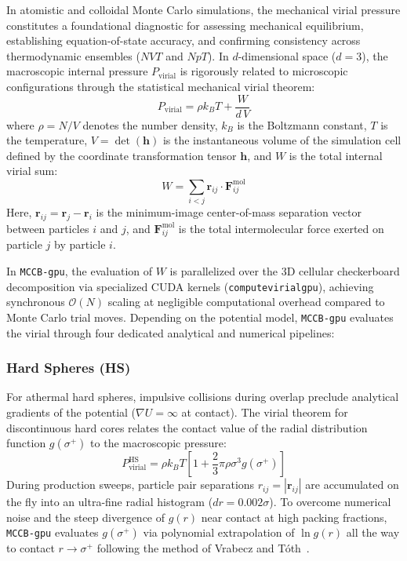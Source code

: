 \documentclass[final,5p,times,twocolumn]{elsarticle}
\begin{document}
In atomistic and colloidal Monte Carlo simulations, the mechanical virial pressure constitutes a foundational diagnostic for assessing mechanical equilibrium, establishing equation-of-state accuracy, and confirming consistency across thermodynamic ensembles ($NVT$ and $NpT$). In $d$-dimensional space ($d=3$), the macroscopic internal pressure $P_{\text{virial}}$ is rigorously related to microscopic configurations through the statistical mechanical virial theorem:
\begin{equation}
    P_{\text{virial}} = \rho k_B T + \frac{W}{d\,V}
    \label{eq:virial_general}
\end{equation}
where $\rho = N/V$ denotes the number density, $k_B$ is the Boltzmann constant, $T$ is the temperature, $V = \det(\mathbf{h})$ is the instantaneous volume of the simulation cell defined by the coordinate transformation tensor $\mathbf{h}$, and $W$ is the total internal virial sum:
\begin{equation}
    W = \sum_{i < j} \mathbf{r}_{ij} \cdot \mathbf{F}_{ij}^{\text{mol}}
    \label{eq:virial_w_general}
\end{equation}
Here, $\mathbf{r}_{ij} = \mathbf{r}_j - \mathbf{r}_i$ is the minimum-image center-of-mass separation vector between particles $i$ and $j$, and $\mathbf{F}_{ij}^{\text{mol}}$ is the total intermolecular force exerted on particle $j$ by particle $i$. 

In \texttt{MCCB-gpu}, the evaluation of $W$ is parallelized over the 3D cellular checkerboard decomposition via specialized CUDA kernels (\texttt{computevirialgpu}), achieving synchronous $\mathcal{O}(N)$ scaling at negligible computational overhead compared to Monte Carlo trial moves. Depending on the potential model, \texttt{MCCB-gpu} evaluates the virial through four dedicated analytical and numerical pipelines:

\subsubsection{Hard Spheres (HS)}
For athermal hard spheres, impulsive collisions during overlap preclude analytical gradients of the potential ($\nabla U = \infty$ at contact). The virial theorem for discontinuous hard cores relates the contact value of the radial distribution function $g(\sigma^+)$ to the macroscopic pressure:
\begin{equation}
    P_{\text{virial}}^{\text{HS}} = \rho k_B T \left[ 1 + \frac{2}{3}\pi \rho \sigma^3 g(\sigma^+) \right]
    \label{eq:hs_virial_sec2}
\end{equation}
During production sweeps, particle pair separations $r_{ij} = |\mathbf{r}_{ij}|$ are accumulated on the fly into an ultra-fine radial histogram ($dr = 0.002\sigma$). To overcome numerical noise and the steep divergence of $g(r)$ near contact at high packing fractions, \texttt{MCCB-gpu} evaluates $g(\sigma^+)$ via polynomial extrapolation of $\ln g(r)$ all the way to contact $r \to \sigma^+$ following the method of Vrabecz and T{\'o}th~\cite{Vrabecz2006}.
\end{document}

